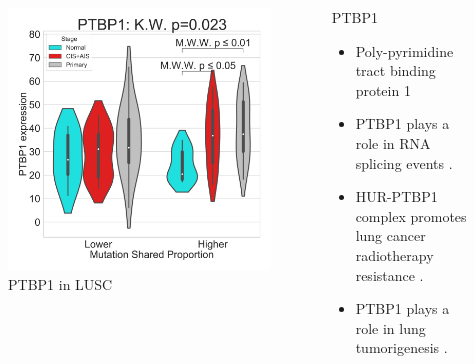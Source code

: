 \documentclass{beamer}
\begin{document}
\begin{frame}[allowframebreaks]
                    \begin{columns}
                        \begin{column}{0.4 \textwidth}
                            \begin{figure}
                                \includegraphics[width=\linewidth]{figures/DEG/Violin/STAR.TPM.SQC.MSP-Median.senescence/Mutation Shared Proportion_PTBP1.pdf}
                                \caption{PTBP1 in LUSC}
                            \end{figure}
                        \end{column}
                        \begin{column}{0.55 \textwidth}
                            \begin{block}{PTBP1}
                                \begin{itemize}
                                    \item Poly-pyrimidine tract binding protein 1
                                    \item PTBP1 plays a role in RNA splicing events \cite{PTBP1-01}.
                                    \item HUR-PTBP1 complex promotes lung cancer radiotherapy resistance \cite{PTBP1-02}.
                                    \item PTBP1 plays a role in lung tumorigenesis \cite{PTBP1-03}.
                                \end{itemize}
                            \end{block}
                        \end{column}
                    \end{columns}
                \end{frame}
\end{document}
